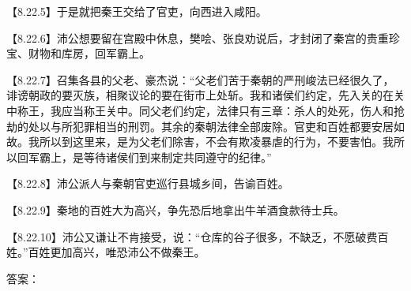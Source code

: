 \documentclass[fontset=none,11pt,a4paper]{ctexart}
\newcommand{\answerline}[1]{\underline{\hspace{#1}}}
\begin{document}
\begin{enumerate}[label=\Alph*.]
\noindent 【8.22.5】于是就把秦王交给了官吏，向西进入咸阳。\par
\noindent 【8.22.6】沛公想要留在宫殿中休息，樊哙、张良劝说后，才封闭了秦宫的贵重珍宝、财物和库房，回军霸上。\par
\noindent 【8.22.7】召集各县的父老、豪杰说：“父老们苦于秦朝的严刑峻法已经很久了，诽谤朝政的要灭族，相聚议论的要在街市上处斩。我和诸侯们约定，先入关的在关中称王，我应当称王关中。同父老们约定，法律只有三章：杀人的处死，伤人和抢劫的处以与所犯罪相当的刑罚。其余的秦朝法律全部废除。官吏和百姓都要安居如故。我所以到这里来，是为父老们除害，不会有欺凌暴虐的行为，不要害怕。我所以回军霸上，是等待诸侯们到来制定共同遵守的纪律。”\par
\noindent 【8.22.8】沛公派人与秦朝官吏巡行县城乡间，告谕百姓。\par
\noindent 【8.22.9】秦地的百姓大为高兴，争先恐后地拿出牛羊酒食款待士兵。\par
\noindent 【8.22.10】沛公又谦让不肯接受，说：“仓库的谷子很多，不缺乏，不愿破费百姓。”百姓更加高兴，唯恐沛公不做秦王。\par
\end{enumerate}
答案：\answerline{2.2cm}
\end{document}
